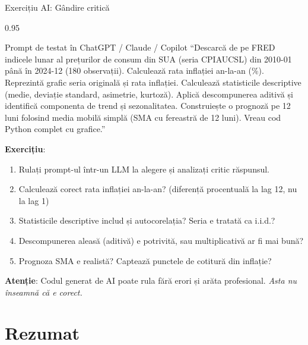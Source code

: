 \documentclass[9pt, aspectratio=169, t]{beamer}
\begin{document}
\begin{frame}{Exercițiu AI: Gândire critică}
    \begin{cminipage}{0.95\textwidth}
    \vspace{-3mm}
    \begin{block}{\footnotesize Prompt de testat în ChatGPT / Claude / Copilot}
        {\footnotesize
        ``Descarcă de pe FRED indicele lunar al prețurilor de consum din SUA (seria CPIAUCSL) din 2010-01 până în 2024-12 (180 observații). Calculează rata inflației an-la-an (\%). Reprezintă grafic seria originală și rata inflației. Calculează statisticile descriptive (medie, deviație standard, asimetrie, kurtoză). Aplică descompunerea aditivă și identifică componenta de trend și sezonalitatea. Construiește o prognoză pe 12 luni folosind media mobilă simplă (SMA cu fereastră de 12 luni). Vreau cod Python complet cu grafice.''
        }
    \end{block}
    \vspace{-2mm}
    {\footnotesize
    \textbf{Exercițiu}:
    \begin{enumerate}\setlength{\itemsep}{0pt}
        \item Rulați prompt-ul într-un LLM la alegere și analizați critic răspunsul.
        \item Calculează corect rata inflației an-la-an? (diferență procentuală la lag 12, nu la lag 1)
        \item Statisticile descriptive includ și autocorelația? Seria e tratată ca i.i.d.?
        \item Descompunerea aleasă (aditivă) e potrivită, sau multiplicativă ar fi mai bună?
        \item Prognoza SMA e realistă? Captează punctele de cotitură din inflație?
    \end{enumerate}
    }
    \vspace{-2mm}
    \begin{alertblock}{}
        {\footnotesize \textbf{Atenție}: Codul generat de AI poate rula fără erori și arăta profesional. \textit{Asta nu înseamnă că e corect.}}
    \end{alertblock}
    \end{cminipage}
\end{frame}

\section{Rezumat}
\end{document}
